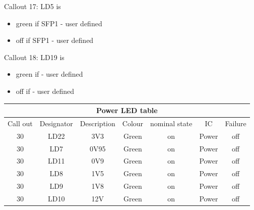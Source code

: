 Callout 17: LD5 is
\begin{itemize}
	\item green if SFP1 - user defined
	\item off if SFP1 - user defined
\end{itemize}

Callout 18: LD19 is
\begin{itemize}
	\item green if - user defined
	\item off if - user defined
\end{itemize}


\begin{longtable}{|c|c|c|c|c|c|c|} \hline
		\multicolumn{7}{|c|}{Power LED table }\\ \hline
	Call out & Designator & Description&  Colour &nominal state& IC &Failure\\ \hline
	30 & LD22 & 3V3 & Green & on & Power & off \\ \hline
	30 & LD7 & 0V95 & Green & on & Power & off \\ \hline 
	30 & LD11 & 0V9 & Green & on & Power & off \\ \hline 
	30 & LD8 & 1V5 & Green & on & Power & off \\ \hline 
	30 & LD9 & 1V8 & Green & on & Power & off \\ \hline 
	30 & LD10 & 12V & Green & on & Power & off \\ \hline  
\end{longtable}

